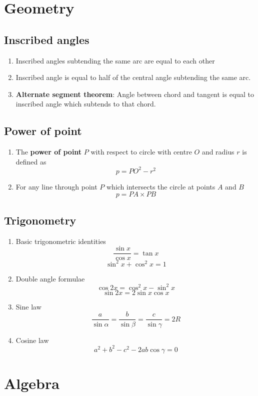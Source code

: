 \documentclass{article}
\begin{document}
\section{Geometry}
  \subsection{Inscribed angles}
    \begin{enumerate}
      \item Inscribed angles subtending the same arc are equal to each other
      \item Inscribed angle is equal to half of the central angle subtending the same arc.
      \item \textbf{Alternate segment theorem}: Angle between chord and tangent is equal to inscribed angle which subtends to that chord.
    \end{enumerate}
  \subsection{Power of point}
    \begin{enumerate}
      \item The \textbf{power of point} $P$ with respect to circle with centre $O$ and radius $r$ is defined as
      $$ p= PO^2-r^2 $$
      \item For any line through point $P$ which intersects the circle at points $A$ and $B$
      $$p= PA \times PB$$
    \end{enumerate}
  \subsection{Trigonometry}
    \begin{enumerate}
      \item Basic trigonometric identities
      $$\frac{\sin x}{\cos x} = \tan x$$
      $$\sin^2 x + \cos^2 x =1$$
      \item Double angle formulae
      $$ \cos 2x = \cos^2 x - \sin^2 x $$
      $$ \sin 2x = 2\sin x \cos x $$
      \item Sine law
      $$\frac{a}{\sin\alpha} = \frac{b}{\sin\beta} = \frac{c}{\sin\gamma} = 2R$$
      \item Cosine law
      $$ a^2 + b^2 - c^2 -2ab\cos\gamma = 0$$
    \end{enumerate}
\newpage
\section{Algebra}
\end{document}
